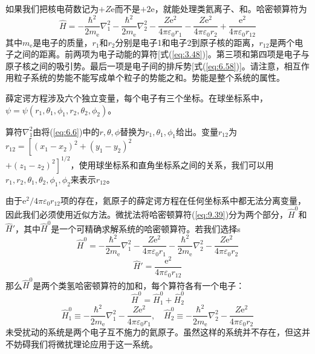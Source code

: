     如果我们把核电荷数记为$+Z\mathrm{e}$而不是$+2\mathrm{e}$，就能处理类氦离子、和。哈密顿算符为
    \begin{equation}
        \hat{H} = -\frac{\hbar^2}{2m_{\mathrm{e}}}\nabla_1^2 - \frac{\hbar^2}{2m_{\mathrm{e}}}\nabla_2^2 - \frac{Z\mathrm{e}^2}{4\pi\varepsilon_0r_1} - \frac{Z\mathrm{e}^2}{4\pi\varepsilon_0r_2} + \frac{\mathrm{e}^2}{4\pi\varepsilon_0r_{12}}
        \label{eq:9.39}
    \end{equation}
    其中$m_{\mathrm{e}}$是电子的质量，$r_1$和$r_2$分别是电子1和电子2到原子核的距离，$r_{12}$是两个电子之间的距离。前两项为电子动能的算符[式(\ref{eq:3.48})]。第三项和第四项是电子与原子核之间的吸引势。最后一项是电子间的排斥势[式(\ref{eq:6.58})]。请注意，相互作用粒子系统的势能不能写成单个粒子的势能之和。势能是整个系统的属性。

    薛定谔方程涉及六个独立变量，每个电子有三个坐标。在球坐标系中，$\psi = \psi\left(r_1,\theta_1,\phi_1,r_2,\theta_2,\phi_2\right)$。

    算符$\nabla_1^2$由将(\ref{eq:6.6})中的$r,\theta,\phi$替换为$r_1,\theta_1,\phi_1$给出。变量$r_{12}$为$r_{12} = \left[\left(x_1 - x_2\right)^2 + \left(y_1 - y_2\right)^2\right.$\\$\left. + \left(z_1 - z_2\right)^2\right]^{1/2}$，使用球坐标系和直角坐标系之间的关系，我们可以用$r_1,r_2,\theta_1,\theta_2,\phi_1,\phi_2$来表示$r_{12}$。

    由于$\mathrm{e}^2 / 4\pi \varepsilon_0r_{12}$项的存在，氦原子的薛定谔方程在任何坐标系中都无法分离变量，因此我们必须使用近似方法。微扰法将哈密顿算符(\ref{eq:9.39})分为两个部分，$\hat{H}^0$和$\hat{H}'$，其中$\hat{H}^0$是一个可精确求解系统的哈密顿算符。若我们选择s
    \begin{equation}
        \hat{H}^0 = -\frac{\hbar^2}{2m_{\mathrm{e}}}\nabla_1^2 - \frac{Z\mathrm{e}^2}{4\pi\varepsilon_0r_1} - \frac{\hbar^2}{2m_{\mathrm{e}}}\nabla_2^2 - \frac{Z\mathrm{e}^2}{4\pi\varepsilon_0r_2}
        \label{eq:9.40}
    \end{equation}
    \begin{equation}
        \hat{H}' = \frac{\mathrm{e}^2}{4\pi\varepsilon_0r_{12}}
        \label{eq:9.41}
    \end{equation}
    那么$\hat{H}^0$是两个类氢哈密顿算符的加和，每个算符各有一个电子：
    \begin{equation}
        \hat{H}^0 = \hat{H}_1^0 + \hat{H}_2^0
        \label{eq:9.42}
    \end{equation}
    \begin{equation}
        \hat{H}_1^0 \equiv -\frac{\hbar^2}{2m_{\mathrm{e}}}\nabla_1^2 - \frac{Z\mathrm{e}^2}{4\pi\varepsilon_0r_1}, \quad \hat{H}_2^0 \equiv -\frac{\hbar^2}{2m_{\mathrm{e}}}\nabla_2^2 - \frac{Z\mathrm{e}^2}{4\pi\varepsilon_0r_2}
        \label{eq:9.43}
    \end{equation}
    未受扰动的系统是两个电子互不施力的氦原子。虽然这样的系统并不存在，但这并不妨碍我们将微扰理论应用于这一系统。

